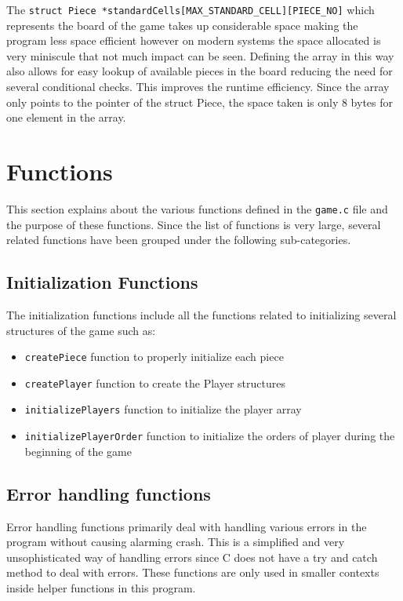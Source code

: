 \documentclass[12pt, a4paper]{report}
\begin{document}
The \lstinline|struct Piece *standardCells[MAX_STANDARD_CELL][PIECE_NO]| which represents the board of the game takes up considerable space making the program less space efficient however on modern systems the space allocated is very miniscule that not much impact can be seen. Defining the array in this way also allows for easy lookup of available pieces in the board reducing the need for several conditional checks. This improves the runtime efficiency. Since the array only points to the pointer of the struct Piece, the space taken is only 8 bytes for one element in the array.

\chapter{Functions}
This section explains about the various functions defined in the \lstinline|game.c| file and the purpose of these functions. Since the list of functions is very large, several related functions have been grouped under the following sub-categories.

\section{Initialization Functions}
The initialization functions include all the functions related to initializing several structures of the game such as:

\begin{itemize}
	\item \lstinline|createPiece| function to properly initialize each piece
	\item \lstinline|createPlayer| function to create the Player structures
	\item \lstinline|initializePlayers| function to initialize the player array
	\item \lstinline|initializePlayerOrder| function to initialize the orders of player during the beginning of the game
\end{itemize}

\section{Error handling functions}
Error handling functions primarily deal with handling various errors in the program without causing alarming crash. This is a simplified and very unsophisticated way of handling errors since C does not have a try and catch method to deal with errors. These functions are only used in smaller contexts inside helper functions in this program.
\end{document}
